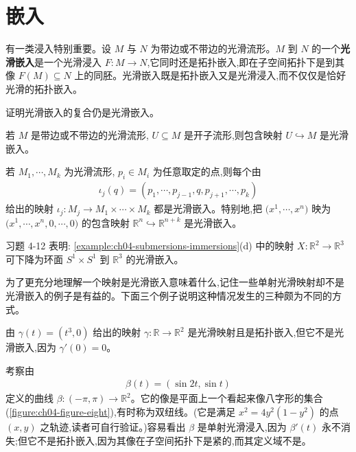 \documentclass[../../main.tex]{subfiles}
\begin{document}
\section{嵌入}\label{section:ch04-嵌入}

有一类浸入特别重要。设 $M$ 与 $N$ 为带边或不带边的光滑流形。$M$ 到 $N$ 的一个\textbf{光滑嵌入}是一个光滑浸入 $F:M\to N$,它同时还是拓扑嵌入,即在子空间拓扑下是到其像 $F(M)\subseteq N$ 上的同胚。光滑嵌入既是拓扑嵌入又是光滑浸入,而不仅仅是恰好光滑的拓扑嵌入。

\begin{exercise}\label{exercise:ch04-embedding-composition}
证明光滑嵌入的复合仍是光滑嵌入。
\end{exercise}

\begin{example}\label{example:ch04-smooth-embeddings}
若 $M$ 是带边或不带边的光滑流形, $U\subseteq M$ 是开子流形,则包含映射 $U\hookrightarrow M$ 是光滑嵌入。

若 $M_1,\cdots ,M_k$ 为光滑流形, $p_i\in M_i$ 为任意取定的点,则每个由
\begin{align*}
\iota_j(q)=(p_1,\cdots ,p_{j-1},q,p_{j+1},\cdots ,p_k)
\end{align*}
给出的映射 $\iota_j:M_j\to M_1\times\cdots\times M_k$ 都是光滑嵌入。特别地,把 $\bigl(x^1,\cdots ,x^n\bigr)$ 映为 $\bigl(x^1,\cdots ,x^n,0,\cdots ,0\bigr)$ 的包含映射 $\mathbb{R}^n\hookrightarrow\mathbb{R}^{n+k}$ 是光滑嵌入。

习题 4-12 表明: \cref{example:ch04-submersions-immersions}(d) 中的映射 $X:\mathbb{R}^2\to\mathbb{R}^3$ 可下降为环面 $S^1\times S^1$ 到 $\mathbb{R}^3$ 的光滑嵌入。
\end{example}

为了更充分地理解一个映射是光滑嵌入意味着什么,记住一些单射光滑映射却不是光滑嵌入的例子是有益的。下面三个例子说明这种情况发生的三种颇为不同的方式。

\begin{example}\label{example:ch04-smooth-topological-embedding}
由 $\gamma(t)=(t^3,0)$ 给出的映射 $\gamma:\mathbb{R}\to\mathbb{R}^2$ 是光滑映射且是拓扑嵌入,但它不是光滑嵌入,因为 $\gamma'(0)=0$。
\end{example}

\begin{example}\label{example:ch04-figure-eight}
考察由
\begin{align*}
\beta(t)=(\sin 2t,\sin t)
\end{align*}
定义的曲线 $\beta:(-\pi,\pi)\to\mathbb{R}^2$。它的像是平面上一个看起来像八字形的集合(\cref{figure:ch04-figure-eight}),有时称为双纽线。(它是满足 $x^2=4y^2(1-y^2)$ 的点 $(x,y)$ 之轨迹,读者可自行验证。)容易看出 $\beta$ 是单射光滑浸入,因为 $\beta'(t)$ 永不消失;但它不是拓扑嵌入,因为其像在子空间拓扑下是紧的,而其定义域不是。
\end{example}
\end{document}
